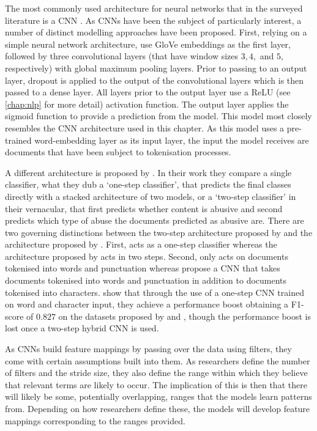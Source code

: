 The most commonly used architecture for neural networks that in the surveyed literature is a CNN \citep{Park:2017,Gamback:2017,Wulczyn:2017,Kolhatkar:2021,Zimmerman:2018,Wang:2020}. As CNNs have been the subject of particularly interest, a number of distinct modelling approaches have been proposed. First, relying on a simple neural network architecture, \citet{Kolhatkar:2021} use GloVe embeddings as the first layer, followed by three convolutional layers (that have window sizes $3, 4,$ and $5$, respectively) with global maximum pooling layers. Prior to passing to an output layer, dropout is applied to the output of the convolutional layers which is then passed to a dense layer. All layers prior to the output layer use a ReLU (see \cref{chap:nlp} for more detail) activation function. The output layer applies the sigmoid function to provide a prediction from the model. This model most closely resembles the CNN architecture used in this chapter. As this model uses a pre-trained word-embedding layer as its input layer, the input the model receives are documents that have been subject to tokenisation processes.

A different architecture is proposed by \citet{Park:2017}. In their work they compare a single classifier, what they dub a `one-step classifier', that predicts the final classes directly with a stacked architecture of two models, or a `two-step classifier' in their vernacular, that first predicts whether content is abusive and second predicts which type of abuse the documents predicted as abusive are. There are two governing distinctions between the two-step architecture proposed by \citet{Park:2017} and the architecture proposed by \citet{Kolhatkar:2021}. First, \citet{Kolhatkar:2021} acts as a one-step classifier whereas the architecture proposed by \citet{Park:2017} acts in two steps. Second, \citet{Kolhatkar:2021} only acts on documents tokenised into words and punctuation whereas \citet{Park:2017} propose a CNN that takes documents tokenised into words and punctuation in addition to documents tokenised into characters. \citet{Park:2017} show that through the use of a one-step CNN trained on word and character input, they achieve a performance boost obtaining a F1-score of $0.827$ on the datasets proposed by \citet{Waseem-Hovy:2016} and \citet{Waseem:2016}, though the performance boost is lost once a two-step hybrid CNN is used.

As CNNs build feature mappings by passing over the data using filters, they come with certain assumptions built into them. As researchers define the number of filters and the stride size, they also define the range within which they believe that relevant terms are likely to occur. The implication of this is then that there will likely be some, potentially overlapping, ranges that the models learn patterns from. Depending on how researchers define these, the models will develop feature mappings corresponding to the ranges provided.

